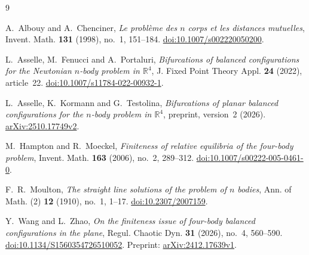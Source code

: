 \documentclass[11pt,a4paper]{amsart}
\numberwithin{equation}{section}
\newcommand{\R}{\mathbb R}
\begin{document}
\begin{thebibliography}{9}

A.~Albouy and A.~Chenciner,
\emph{Le probl\`eme des $n$ corps et les distances mutuelles},
Invent. Math. \textbf{131} (1998), no.~1, 151--184.
\href{https://doi.org/10.1007/s002220050200}{doi:10.1007/s002220050200}.

L.~Asselle, M.~Fenucci and A.~Portaluri,
\emph{Bifurcations of balanced configurations for the Newtonian $n$-body
problem in $\R^4$},
J. Fixed Point Theory Appl. \textbf{24} (2022), article~22.
\href{https://doi.org/10.1007/s11784-022-00932-1}{doi:10.1007/s11784-022-00932-1}.

L.~Asselle, K.~Kormann and G.~Testolina,
\emph{Bifurcations of planar balanced configurations for the $n$-body
problem in $\R^4$},
preprint, version~2 (2026).
\href{https://arxiv.org/abs/2510.17749v2}{arXiv:2510.17749v2}.

M.~Hampton and R.~Moeckel,
\emph{Finiteness of relative equilibria of the four-body problem},
Invent. Math. \textbf{163} (2006), no.~2, 289--312.
\href{https://doi.org/10.1007/s00222-005-0461-0}{doi:10.1007/s00222-005-0461-0}.

F.~R.~Moulton,
\emph{The straight line solutions of the problem of $n$ bodies},
Ann. of Math. (2) \textbf{12} (1910), no.~1, 1--17.
\href{https://doi.org/10.2307/2007159}{doi:10.2307/2007159}.

Y.~Wang and L.~Zhao,
\emph{On the finiteness issue of four-body balanced configurations in
the plane},
Regul. Chaotic Dyn. \textbf{31} (2026), no.~4, 560--590.
\href{https://doi.org/10.1134/S1560354726510052}{doi:10.1134/S1560354726510052}.
Preprint: \href{https://arxiv.org/abs/2412.17639v1}{arXiv:2412.17639v1}.

\end{thebibliography}
\end{document}
